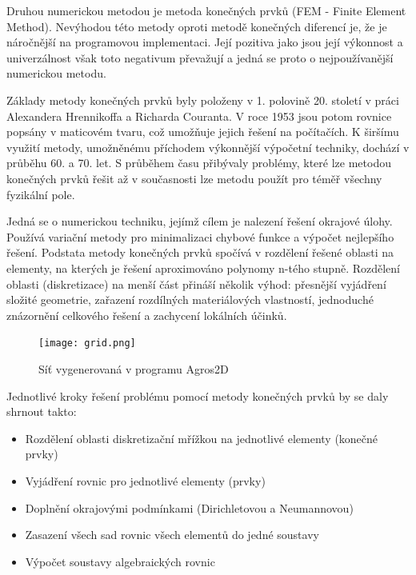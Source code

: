 \documentclass[12pt,a4paper,oneside]{article}
\numberwithin{equation}{section} %
\numberwithin{figure}{section} %
\numberwithin{table}{section} %
\begin{document}
Druhou numerickou metodou je metoda konečných prvků (FEM - Finite Element Method). Nevýhodou této metody oproti metodě konečných diferencí je, že je náročnější na programovou implementaci. Její pozitiva jako jsou její výkonnost a univerzálnost však toto negativum převažují a jedná se proto o nejpoužívanější numerickou metodu. 

Základy metody konečných prvků byly položeny v 1. polovině 20. století v práci Alexandera Hrennikoffa a Richarda Couranta. V roce 1953 jsou potom rovnice popsány v maticovém tvaru, což umožňuje jejich řešení na počítačích. K širšímu využití metody, umožněnému příchodem výkonnější výpočetní techniky, dochází v průběhu 60. a 70. let. S průběhem času přibývaly problémy, které lze metodou konečných prvků řešit až v současnosti lze metodu použít pro téměř všechny fyzikální pole.

Jedná se o numerickou techniku, jejímž cílem je nalezení řešení okrajové úlohy. Používá variační metody pro minimalizaci chybové funkce a výpočet nejlepšího řešení. Podstata metody konečných prvků spočívá v rozdělení řešené oblasti na elementy, na kterých je řešení aproximováno polynomy n-tého stupně. Rozdělení oblasti (diskretizace) na menší část přináší několik výhod: přesnější vyjádření složité geometrie, zařazení rozdílných materiálových vlastností, jednoduché znázornění celkového řešení a zachycení lokálních účinků. 

\begin{figure}[h] %
\begin{center}
\texttt{[image: grid.png]} %
\caption{Síť vygenerovaná v programu Agros2D} %
\end{center}
\end{figure}

Jednotlivé kroky řešení problému pomocí metody konečných prvků by se daly shrnout takto:
\begin{itemize}
\item Rozdělení oblasti diskretizační mřížkou  na jednotlivé elementy (konečné prvky)
\item Vyjádření rovnic pro jednotlivé elementy (prvky)
\item Doplnění okrajovými podmínkami (Dirichletovou a Neumannovou)
\item Zasazení všech sad rovnic všech elementů do jedné soustavy
\item Výpočet soustavy algebraických rovnic
\end{itemize}
\end{document}

